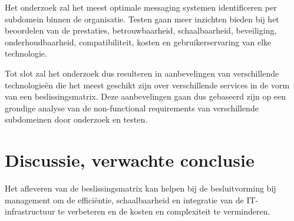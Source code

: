 

Het onderzoek zal het meest optimale messaging systemen identificeren per subdomein binnen de organisatie.
Testen gaan meer inzichten bieden bij het beoordelen van de prestaties, betrouwbaarheid, 
schaalbaarheid, beveiliging, onderhoudbaarheid, compatibiliteit, kosten en gebruikerservaring van elke technologie.
\newline

Tot slot zal het onderzoek dus resulteren in aanbevelingen van verschillende technologieën die het meest geschikt zijn
over verschillende services in de vorm van een beslissingsmatrix. 
Deze aanbevelingen gaan dus gebaseerd zijn op een grondige analyse van de non-functional requirements van verschillende subdomeinen 
door onderzoek en testen.


\section{Discussie, verwachte conclusie}%
\label{sec:discussie-conclusie}

Het afleveren van de beslissingsmatrix kan helpen bij de besluitvorming bij management om de efficiëntie, schaalbaarheid en integratie van de IT-infrastructuur te verbeteren
en de kosten en complexiteit te verminderen. 

